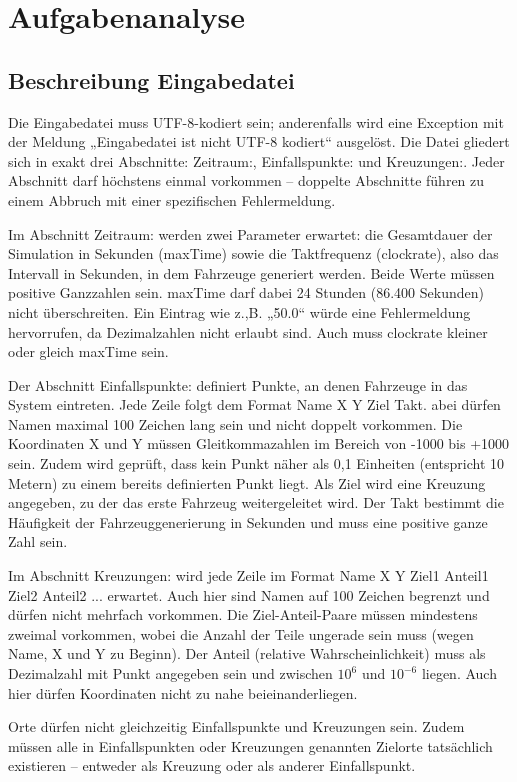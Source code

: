 \chapter{Aufgabenanalyse}
\section{Beschreibung Eingabedatei}

Die Eingabedatei muss UTF-8-kodiert sein;
anderenfalls wird eine Exception mit der Meldung „Eingabedatei ist nicht UTF-8 kodiert“ ausgelöst.
Die Datei gliedert sich in exakt drei Abschnitte: Zeitraum:, Einfallspunkte: und Kreuzungen:.
Jeder Abschnitt darf höchstens einmal vorkommen – doppelte Abschnitte führen zu einem Abbruch mit einer spezifischen Fehlermeldung.

Im Abschnitt Zeitraum: werden zwei Parameter erwartet: die Gesamtdauer der Simulation in Sekunden (maxTime) sowie die Taktfrequenz (clockrate),
also das Intervall in Sekunden, in dem Fahrzeuge generiert werden.
Beide Werte müssen positive Ganzzahlen sein. maxTime darf dabei 24 Stunden (86.400 Sekunden) nicht überschreiten.
Ein Eintrag wie z.,B. „50.0“ würde eine Fehlermeldung hervorrufen,
da Dezimalzahlen nicht erlaubt sind. Auch muss clockrate kleiner oder gleich maxTime sein.

Der Abschnitt Einfallspunkte: definiert Punkte,
an denen Fahrzeuge in das System eintreten.
Jede Zeile folgt dem Format Name X Y Ziel Takt. 
abei dürfen Namen maximal 100 Zeichen lang sein und nicht doppelt vorkommen.
Die Koordinaten X und Y müssen Gleitkommazahlen im Bereich von -1000 bis +1000 sein.
Zudem wird geprüft, dass kein Punkt näher als 0{,}1 Einheiten (entspricht 10 Metern) zu einem bereits definierten Punkt liegt.
Als Ziel wird eine Kreuzung angegeben, zu der das erste Fahrzeug weitergeleitet wird.
Der Takt bestimmt die Häufigkeit der Fahrzeuggenerierung in Sekunden und muss eine positive ganze Zahl sein.

Im Abschnitt Kreuzungen: wird jede Zeile im Format Name X Y Ziel1 Anteil1 Ziel2 Anteil2 ... erwartet.
Auch hier sind Namen auf 100 Zeichen begrenzt und dürfen nicht mehrfach vorkommen.
Die Ziel-Anteil-Paare müssen mindestens zweimal vorkommen,
wobei die Anzahl der Teile ungerade sein muss (wegen Name, X und Y zu Beginn).
Der Anteil (relative Wahrscheinlichkeit) muss als Dezimalzahl mit Punkt angegeben sein und zwischen $10^6$ und $10^{-6}$ liegen.
Auch hier dürfen Koordinaten nicht zu nahe beieinanderliegen.

Orte dürfen nicht gleichzeitig Einfallspunkte und Kreuzungen sein. Zudem müssen alle in Einfallspunkten oder Kreuzungen genannten Zielorte tatsächlich existieren – entweder als Kreuzung oder als anderer Einfallspunkt.

